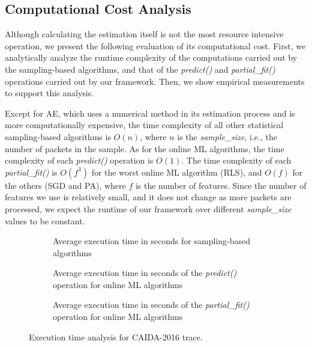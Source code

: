 	\subsection{Computational Cost Analysis} \label{sec:computational_cost}
	
		Although calculating the estimation itself is not the most resource intensive operation, we present the following evaluation of its computational cost. First, we analytically analyze the runtime complexity of the computations carried out by the sampling-based algorithms, and that of the \emph{predict()} and \emph{partial\_fit()} operations carried out by our framework. Then, we show empirical measurements to support this analysis.
		
		Except for AE, which uses a numerical method in its estimation process and is more computationally expensive, the time complexity of all other statistical sampling-based algorithms is $O(n)$, where $n$ is the \emph{sample\_size}, i.e., the number of packets in the sample. As for the online ML algorithms, the time complexity of each \emph{predict()} operation is $O(1)$. The time complexity of each \emph{partial\_fit()} is $O(f^3)$ for the worst online ML algorithm (RLS), and $O(f)$ for the others (SGD and PA), where $f$ is the number of features. Since the number of features we use is relatively small, and it does not change as more packets are processed, we expect the runtime of our framework over different \emph{sample\_size} values to be constant.
		
		\begin{figure}[!tb]
			\centering
			\begin{subfigure}{.95\columnwidth}
				\centering
				\small
				
				\caption{Average execution time in seconds for sampling-based algorithms}
				\label{table:time_estimate}
			\end{subfigure}
			\vspace{5mm}
			
			\begin{subfigure}{.95\columnwidth}
				\centering
				\small
				
				\caption{Average execution time in seconds of the \emph{predict()} operation for online ML algorithms}
				\label{table:time_predict}
			\end{subfigure}
			
			\vspace{5mm}
			\begin{subfigure}{.95\columnwidth}
				\centering
				\small
				
				\caption{Average execution time in seconds of the \emph{partial\_fit()} operation for online ML algorithms}
				\label{table:time_fit}
			\end{subfigure}
			
			\caption{Execution time analysis for CAIDA-2016 trace.}
			\label{fig:time_analysis}
		\end{figure}
		
